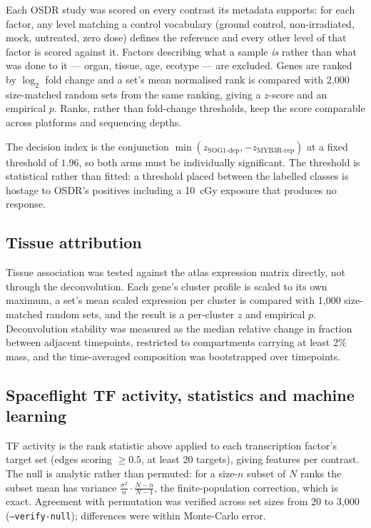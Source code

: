 Each OSDR study was scored on every contrast its metadata supports: for each factor, any
level matching a control vocabulary (ground control, non-irradiated, mock, untreated, zero
dose) defines the reference and every other level of that factor is scored against it.
Factors describing what a sample \emph{is} rather than what was done to it --- organ,
tissue, age, ecotype --- are excluded. Genes are ranked by $\log_2$ fold change and a set's
mean normalised rank is compared with 2,000 size-matched random sets from the same
ranking, giving a $z$-score and an empirical $p$. Ranks, rather than fold-change
thresholds, keep the score comparable across platforms and sequencing depths.

The decision index is the conjunction $\min(z_{\text{SOG1-dep}}, -z_{\text{MYB3R-rep}})$ at
a fixed threshold of $1.96$, so both arms must be individually significant. The threshold
is statistical rather than fitted: a threshold placed between the labelled classes is
hostage to OSDR's positives including a 10~cGy exposure that produces no response.

\subsection{Tissue attribution}

Tissue association was tested against the atlas expression matrix directly, not through
the deconvolution. Each gene's cluster profile is scaled to its own maximum, a set's mean
scaled expression per cluster is compared with 1,000 size-matched random sets, and the
result is a per-cluster $z$ and empirical $p$. Deconvolution stability was measured as the
median relative change in fraction between adjacent timepoints, restricted to compartments
carrying at least 2\% mass, and the time-averaged composition was bootstrapped over
timepoints.

\subsection{Spaceflight TF activity, statistics and machine learning}

TF activity is the rank statistic above applied to each transcription factor's target set
(edges scoring $\ge 0.5$, at least 20 targets), giving \NumTFFeatures{} features per
contrast. The null is analytic rather than permuted: for a size-$n$ subset of $N$ ranks the
subset mean has variance $\frac{\sigma^2}{n}\cdot\frac{N-n}{N-1}$, the finite-population
correction, which is exact. Agreement with permutation was verified across set sizes from
20 to 3{,}000 (\texttt{--verify-null}); differences were within Monte-Carlo error.

